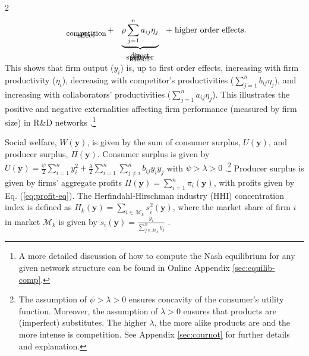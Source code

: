 \documentclass[12pt]{article}
\begin{document}
\begin{spacing}{2}
\begin{equation}
{\begin{array}{c}
\vspace{-0.35cm} \small \text{competition} \\
\vspace{-0.35cm} \small \text{effect}
\end{array}
}
\hspace{-0.2cm}
+ 
\hspace{0.25cm}
\underbrace{\rho \sum_{j=1}^n a_{ij} \eta_j}_{
\begin{array}{c}
\vspace{-0.35cm} \small \text{direct} \\
\vspace{-0.35cm} \small \text{spillover} \\
\vspace{-0.35cm} \small \text{effect}
\end{array}
}
\hspace{0.25cm}
+ 
\hspace{0.1cm}
\text{higher order effects.}
\label{eq:output-prod-first-order}
\end{equation}
This shows that firm output ($y_i$) is, up to first order effects, increasing with firm productivity ($\eta_i$), decreasing with competitor's productivities ($\sum_{j=1}^n b_{ij} \eta_j$), and increasing with collaborators' productivities ($\sum_{j=1}^n a_{ij} \eta_j$). This illustrates the positive and negative externalities affecting firm performance (measured by firm size) in R\&D networks \citep[cf. e.g.][]{Bloom2013, Konig2018}.\footnote{A more detailed discussion of how to compute the Nash equilibrium for any given network structure can be found in Online Appendix \ref{sec:equilib-comp}.}

Social welfare, $W(\mathbf{y})$, is given by the sum of consumer surplus, $U(\mathbf{y})$, and producer surplus, $\Pi(\mathbf{y})$. Consumer surplus is given by $U(\mathbf{y}) = \frac{\psi}{2} \sum_{i=1}^n y_i^2 + \frac{\lambda}{2} \sum_{i=1}^n \sum_{j \neq i}^n b_{ij} y_i y_j$ with $\psi>\lambda>0$ %
\citep{Singh1984,vives1999oligopoly}.\footnote{The assumption of $\psi>\lambda>0$ ensures concavity of the consumer's utility function. Moreover, the assumption of $\lambda>0$ ensures that products are (imperfect) substitutes. The higher $\lambda$, the more alike products are and the more intense is competition. 
See Appendix \ref{sec:cournot} for further details and explanation.} %
Producer surplus is given by firms' aggregate profits $\Pi(\mathbf{y}) = \sum_{i=1}^n \pi_i(\mathbf{y})$, with profits given by Eq. (\ref{eq:profit-eq}). The Herfindahl-Hirschman industry (HHI) concentration index is defined as $H_k(\mathbf{y}) = \sum_{i \in \mathcal{M}_k} s_i^2(\mathbf{y})$, where the market share of firm $i$ in market $\mathcal{M}_k$ is given by $s_i(\mathbf{y}) = \frac{y_i}{\sum_{j \in \mathcal{M}_k}^n y_j}$ \citep[cf. e.g.][]{tirole88:_theor_indus_orgniz, Hirschman1964}.


\end{spacing}
\end{document}
